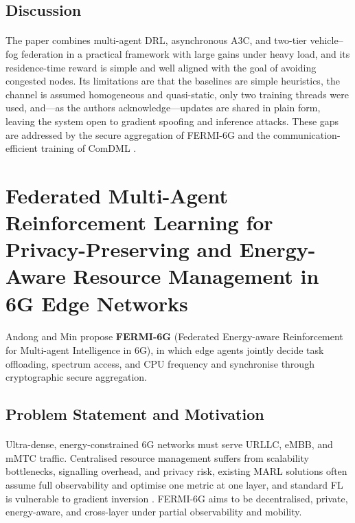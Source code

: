 \documentclass[12pt,a4paper,final]{extreport}
\begin{document}
\subsection{Discussion}

\paragraph{} The paper combines multi-agent DRL, asynchronous A3C, and two-tier vehicle--fog federation in a practical framework with large gains under heavy load, and its residence-time reward is simple and well aligned with the goal of avoiding congested nodes. Its limitations are that the baselines are simple heuristics, the channel is assumed homogeneous and quasi-static, only two training threads were used, and---as the authors acknowledge---updates are shared in plain form, leaving the system open to gradient spoofing and inference attacks. These gaps are addressed by the secure aggregation of FERMI-6G \cite{p2} and the communication-efficient training of ComDML \cite{p4}.

\section{Federated Multi-Agent Reinforcement Learning for Privacy-Preserving and Energy-Aware Resource Management in 6G Edge Networks}

\paragraph{} Andong and Min \cite{p2} propose \textbf{FERMI-6G} (Federated Energy-aware Reinforcement for Multi-agent Intelligence in 6G), in which edge agents jointly decide task offloading, spectrum access, and CPU frequency and synchronise through cryptographic secure aggregation.

\subsection{Problem Statement and Motivation}

\paragraph{} Ultra-dense, energy-constrained 6G networks must serve URLLC, eMBB, and mMTC traffic. Centralised resource management suffers from scalability bottlenecks, signalling overhead, and privacy risk, existing MARL solutions often assume full observability and optimise one metric at one layer, and standard FL is vulnerable to gradient inversion \cite{p2}. FERMI-6G aims to be decentralised, private, energy-aware, and cross-layer under partial observability and mobility.
\end{document}
